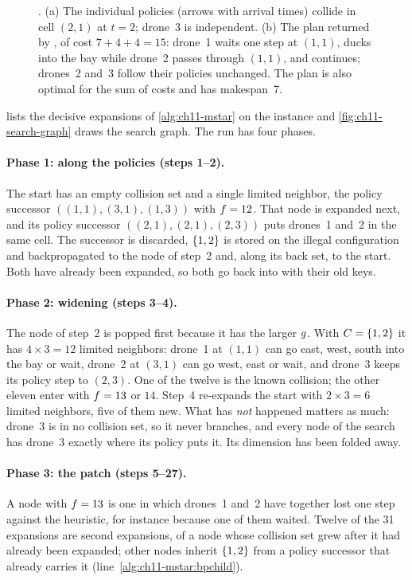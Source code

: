 \begin{figure}[!tb]
  \centering
  \caption{. (a) The individual policies (arrows with
  arrival times) collide in cell $(2,1)$ at $t = 2$; drone~3 is
  independent. (b) The plan returned by \mstar, of cost $7 + 4 + 4 = 15$:
  drone~1 waits one step at $(1,1)$, ducks into the bay while drone~2 passes
  through $(1,1)$, and continues; drones~2 and~3 follow their policies
  unchanged. The plan is also optimal for the sum of costs and has
  makespan~7.}
  \label{fig:ch11-example}
\end{figure}

 lists the decisive expansions of \cref{alg:ch11-mstar}
on the instance and \cref{fig:ch11-search-graph} draws the search graph.
The run has four phases.

\paragraph{Phase 1: along the policies (steps 1--2).} The start has an
empty collision set and a single limited neighbor, the policy successor
$((1,1), (3,1), (1,3))$ with $f = 12$. That node is expanded next, and
its policy successor $((2,1), (2,1), (2,3))$ puts drones~1 and~2 in the same
cell. The successor is discarded, $\left\{ 1,2 \right\}$ is stored on the illegal
configuration and backpropagated to the node of step~2 and, along its back
set, to the start. Both have already been expanded, so both go back into
\Open with their old keys.

\paragraph{Phase 2: widening (steps 3--4).} The node of step~2 is popped
first because it has the larger $g$. With $C = \left\{ 1,2 \right\}$ it has
$4 \times 3 = 12$ limited neighbors: drone~1 at $(1,1)$ can go east, west,
south into the bay or wait, drone~2 at $(3,1)$ can go west, east or wait,
and drone~3 keeps its policy step to $(2,3)$. One of the twelve is the known
collision; the other eleven enter \Open with $f = 13$ or $14$. Step~4
re-expands the start with $2 \times 3 = 6$ limited neighbors, five of them
new. What has \emph{not} happened matters as much: drone~3 is in no
collision set, so it never branches, and every node of the search has
drone~3 exactly where its policy puts it. Its dimension has been folded
away.

\paragraph{Phase 3: the patch (steps 5--27).} A node with $f = 13$ is
one in which drones~1 and~2 have together lost one step against the
heuristic, for instance because one of them waited. Twelve of the 31
expansions are second expansions, of a node whose collision set grew after
it had already been expanded; other nodes inherit $\left\{ 1,2 \right\}$ from a policy
successor that already carries it (line~\ref{alg:ch11-mstar:bpchild}).

